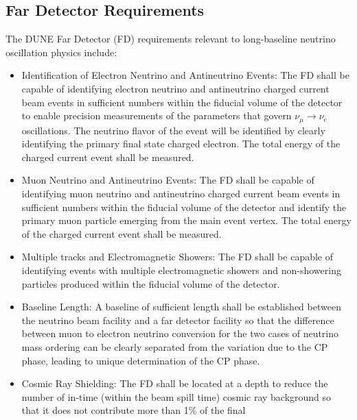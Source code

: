 \subsection{Far Detector Requirements}
\label{sec:physics-lbnosc-fd-req}

The DUNE Far Detector (FD) requirements relevant to long-baseline
neutrino oscillation physics include:
\begin{itemize}
\item Identification of Electron Neutrino and Antineutrino Events: The
  FD shall be capable of identifying electron neutrino and
  antineutrino charged current beam events in sufficient numbers 
  within the fiducial volume of the detector to enable precision
  measurements of the parameters that govern $\nu_\mu \rightarrow
  \nu_e$ oscillations. The neutrino flavor of the event will be
  identified by clearly identifying the primary final state charged
  electron. The total energy of the charged current event shall be
  measured.
\item Muon Neutrino and Antineutrino Events: The FD shall be capable
  of identifying muon neutrino and antineutrino charged current beam
  events in sufficient numbers 
within the fiducial volume of the
  detector and identify the primary muon particle emerging from the
  main event vertex. 
   The total energy of the charged current event
  shall be measured.
\item Multiple tracks and Electromagnetic Showers: The FD shall be
  capable of identifying events with multiple electromagnetic showers
  and non-showering particles produced within the fiducial volume of
  the detector.
\item Baseline Length: A baseline of sufficient length shall be
  established between the neutrino beam facility and a far detector
  facility so that the difference between muon to electron neutrino
  conversion for the two cases of neutrino mass ordering can be
  clearly separated from the variation due to the CP phase, leading to
  unique determination of the CP phase.
\item Cosmic Ray Shielding: The FD shall be located at a depth to
  reduce the number of in-time (within the beam spill time) cosmic ray
  background so that it does not contribute more than 1\% of the final

\end{itemize}
